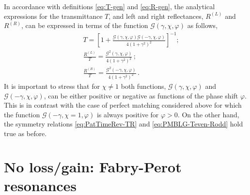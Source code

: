 \documentclass[aps,pra,reprint,showpacs,bibnotes,preprintnumbers,twoside,eqsecnum]{revtex4-1}
\begin{document}
In accordance with definitions \eqref{eq:T-gen} and \eqref{eq:R-gen}, the analytical expressions for the transmittance $T$, and left and right reflectances, $R^{(L)}$ and $R^{(R)}$, can be expressed in terms of the function $\mathcal{G}(\gamma,\chi,\varphi)$ as follows,
%
\begin{eqnarray}
&&T=\left[1+\frac{\mathcal{G}(\gamma,\chi,\varphi)\mathcal{G}(-\gamma,\chi,\varphi)}{4(1+\gamma^2)^{2}}\right]^{-1};\label{eq:MLBLG-T}\\
&&\frac{R^{(L)}}{T}=\frac{\mathcal{G}^2(\gamma,\chi,\varphi)}{4(1+\gamma^2)^{2}}\,;\label{eq:MLBLG-lR}\\
&&\frac{R^{(R)}}{T}=\frac{\mathcal{G}^2(-\gamma,\chi,\varphi)}{4(1+\gamma^2)^{2}}\,.\label{eq:MLBLG-rR}
\end{eqnarray}
It is important to stress that for $\chi\neq1$ both functions, $\mathcal{G}(\gamma,\chi,\varphi)$ and $\mathcal{G}(-\gamma,\chi,\varphi)$, can be either positive or negative as functions of the phase shift $\varphi$. This is in contrast with the case of perfect matching considered above for which the function $\mathcal{G}(-\gamma,\chi=1,\varphi)$ is always positive for $\varphi>0$. On the other hand, the symmetry relations \eqref{eq:PatTimeRev-TR} and \eqref{eq:PMBLG-Teven-Rodd} hold true as before.

\section{No loss/gain: Fabry-Perot resonances}
\end{document}
